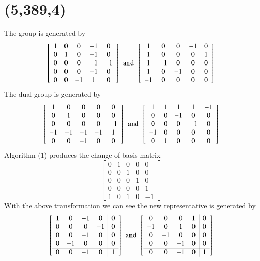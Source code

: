   \section{(5,389,4)}
The group is generated by 
$$
 \left[ \begin {array}{ccccc} 1&0&0&-1&0\\0&1&0&-1&0
\\0&0&0&-1&-1\\0&0&0&-1&0
\\0&0&-1&1&0\end {array} \right] 
\,\,\, \text{and} \,\,\,
 \left[ \begin {array}{ccccc} 1&0&0&-1&0\\1&0&0&0&1
\\1&-1&0&0&0\\1&0&-1&0&0
\\-1&0&0&0&0\end {array} \right] 
$$
The dual group is generated by 
$$
 \left[ \begin {array}{ccccc} 1&0&0&0&0\\0&1&0&0&0
\\0&0&0&0&-1\\-1&-1&-1&-1&1
\\0&0&-1&0&0\end {array} \right] 
\,\,\, \text{and} \,\,\,
 \left[ \begin {array}{ccccc} 1&1&1&1&-1\\0&0&-1&0&0
\\0&0&0&-1&0\\-1&0&0&0&0
\\0&1&0&0&0\end {array} \right] 
$$
Algorithm (1) produces the change of basis matrix 
$$
 \left[ \begin {array}{ccccc} 0&1&0&0&0\\ 0&0&1&0&0
\\ 0&0&0&1&0\\ 0&0&0&0&1
\\ 1&0&1&0&-1\end {array} \right] 
$$
With the above transformation we can see the new representative is generated by 
$$
 \left[ \begin {array}{cccc|c} 1&0&-1&0&0\\0&0&0&-1&0
\\0&0&-1&0&0\\0&-1&0&0&0
\\ \hline 0&0&-1&0&1\end {array} \right]
\,\,\, \text{and} \,\,\,
 \left[ \begin {array}{cccc|c} 0&0&0&1&0\\-1&0&1&0&0
\\0&-1&0&0&0\\0&0&-1&0&0
\\ \hline 0&0&-1&0&1\end {array} \right] 
$$
